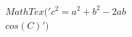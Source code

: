 \documentclass[preview]{standalone}
\begin{document}
\begin{align*}
MathTex('c^2 = a^2 + b^2 - 2ab\\cos(C)')
\end{align*}
\end{document}
